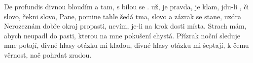 \begin{TEXT}{De profundis}
\SLOKA {} divnou  bloudím  a tam, \NL
{} s bílou  se .  \NL
{} už,  je pravda,  je klam,  \NL
{} jdu-li , či 
\REFREN  {} slovo, řekni slovo, Pane,\NL
{} pomine tahle šedá tma,\NL
{} slovo a zázrak se stane, \NL
uzdra   
\SLOKA Nerozeznám dobře okraj propasti,\NL
nevím, je-li na krok dosti místa.\NL
Strach mám, abych neupadl do pasti,\NL
kterou na mne pokušení chystá.
\SLOKA Přízrak noční sleduje mne potají,\NL
divné hlasy otázku mi kladou,\NL
divné hlasy otázku mi šeptají,\NL
k čemu věrnost, nač pohrdat zradou.\NL
\end{TEXT}
